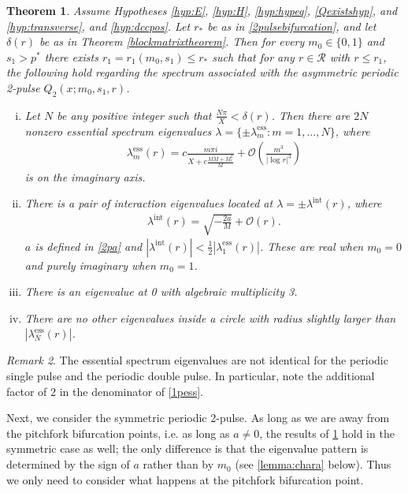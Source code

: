 \documentclass[10pt,reqno]{amsart}
\theoremstyle{plain}
\newtheorem{theorem}{Theorem}
\theoremstyle{definition}
\theoremstyle{remark}
\newtheorem{remark}[theorem]{Remark}
\numberwithin{theorem}{section}
\numberwithin{equation}{section}
\begin{document}
\begin{theorem}\label{theorem:2peigsassym}
Assume Hypotheses \ref{hyp:E}, \ref{hyp:H}, \ref{hyp:hypeq}, \ref{Qexistshyp}, and \ref{hyp:transverse}, and \ref{hyp:dccpos}. Let $r_*$ be as in \cref{2pulsebifurcation}, and let $\delta(r)$ be as in Theorem \ref{blockmatrixtheorem}. Then for every $m_0 \in \{0, 1\}$ and $s_1 > p^*$ there exists $r_1 = r_1(m_0, s_1) \leq r_*$ such that for any $r \in \mathcal{R}$ with $r \leq r_1$, the following hold regarding the spectrum associated with the asymmetric periodic 2-pulse $Q_2(x; m_0, s_1, r)$.

\begin{enumerate}[(i)]
\item Let $N$ be any positive integer such that $\frac{N \pi}{X} < \delta(r)$. Then there are $2N$ nonzero essential spectrum eigenvalues $\lambda = \{ \pm \lambda_m^{\text{ess}} : m = 1, \dots, N \}$, where
\begin{align}\label{2pess}
\lambda_m^{\text{ess}}(r) = c \frac{m \pi i}{X + c \frac{M\tilde{M} + M_c^2}{M}} +  \mathcal{O}\left( \frac{m^3}{|\log r|^3} \right)
\end{align}
is on the imaginary axis.

\item There is a pair of interaction eigenvalues located at $\lambda = \pm \lambda^{\text{int}}(r)$, where
\begin{align*}
\lambda^{\text{int}}(r) = \sqrt{-\frac{2a}{M}} + \mathcal{O}\left( r \right).
\end{align*}
$a$ is defined in \cref{2pa} and $|\lambda^{\text{int}}(r)| < \frac{1}{2}|\lambda_1^{\text{ess}}(r)|$. These are real when $m_0 = 0$ and purely imaginary when $m_0 = 1$.
\item There is an eigenvalue at 0 with algebraic multiplicity 3. 
\item There are no other eigenvalues inside a circle with radius slightly larger than $|\lambda_{N}^{\text{ess}}(r)|$.
\end{enumerate}
\end{theorem}

\begin{remark}The essential spectrum eigenvalues are not identical for the periodic single pulse and the periodic double pulse. In particular, note the additional factor of 2 in the denominator of \cref{1pess}.
\end{remark}

Next, we consider the symmetric periodic 2-pulse. As long as we are away from the pitchfork bifurcation points, i.e. as long as $a \neq 0$, the results of \cref{theorem:2peigsassym} hold in the symmetric case as well; the only difference is that the eigenvalue pattern is determined by the sign of $a$ rather than by $m_0$ (see \cref{lemma:chara} below). Thus we only need to consider what happens at the pitchfork bifurcation point.
\end{document}

